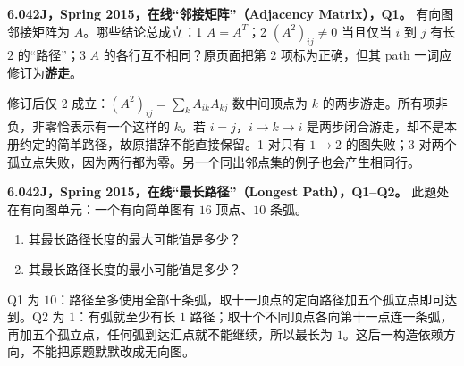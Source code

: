 \begin{exercise}\label{mit:6042-online-adjacency-matrix-q1}
\textbf{6.042J，Spring 2015，在线“邻接矩阵”（Adjacency Matrix），Q1。}
有向图邻接矩阵为 $A$。哪些结论总成立：1 $A=A^T$；2 $(A^2)_{ij}\ne0$ 当且仅当 $i$ 到 $j$ 有长 $2$ 的“路径”；3 $A$ 的各行互不相同？原页面把第 2 项标为正确，但其 path 一词应修订为\textbf{游走}。
\end{exercise}
\begin{solution}
修订后仅 2 成立：$(A^2)_{ij}=\sum_k A_{ik}A_{kj}$ 数中间顶点为 $k$ 的两步游走。所有项非负，非零恰表示有一个这样的 $k$。若 $i=j$，$i\to k\to i$ 是两步闭合游走，却不是本册约定的简单路径，故原措辞不能直接保留。1 对只有 $1\to2$ 的图失败；3 对两个孤立点失败，因为两行都为零。另一个同出邻点集的例子也会产生相同行。
\end{solution}

\begin{exercise}
\textbf{6.042J，Spring 2015，在线“最长路径”（Longest Path），Q1--Q2。}
此题处在有向图单元：一个有向简单图有 $16$ 顶点、$10$ 条弧。
\begin{enumerate}[label=Q\arabic*.]
\item\label{mit:6042-online-longest-path-q1} 其最长路径长度的最大可能值是多少？
\item\label{mit:6042-online-longest-path-q2} 其最长路径长度的最小可能值是多少？
\end{enumerate}
\end{exercise}
\begin{solution}
Q1 为 $10$：路径至多使用全部十条弧，取十一顶点的定向路径加五个孤立点即可达到。Q2 为 $1$：有弧就至少有长 $1$ 路径；取十个不同顶点各向第十一点连一条弧，再加五个孤立点，任何弧到达汇点就不能继续，所以最长为 $1$。这后一构造依赖方向，不能把原题默默改成无向图。
\end{solution}

